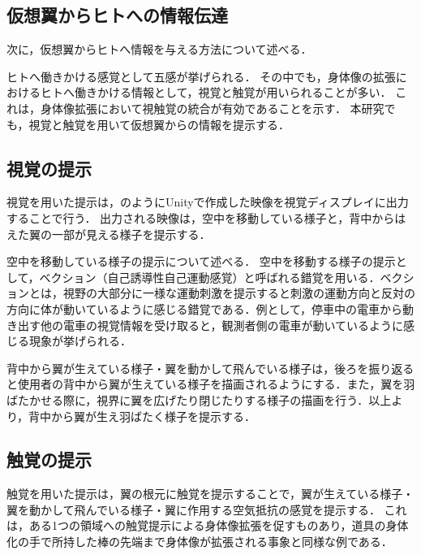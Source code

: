 \begin{small}
  \subsection{仮想翼からヒトへの情報伝達}
    次に，仮想翼からヒトへ情報を与える方法について述べる．

    ヒトへ働きかける感覚として五感が挙げられる．
    その中でも，身体像の拡張におけるヒトへ働きかける情報として，視覚と触覚が用いられることが多い．
    これは，身体像拡張において視触覚の統合が有効であることを示す．
    本研究でも，視覚と触覚を用いて仮想翼からの情報を提示する．
   

    \subsection{視覚の提示} %
      
      視覚を用いた提示は，のようにUnityで作成した映像を視覚ディスプレイに出力することで行う．
      出力される映像は，空中を移動している様子と，背中からはえた翼の一部が見える様子を提示する．

      空中を移動している様子の提示について述べる．
      空中を移動する様子の提示として，ベクション（自己誘導性自己運動感覚）と呼ばれる錯覚を用いる．ベクションとは，視野の大部分に一様な運動刺激を提示すると刺激の運動方向と反対の方向に体が動いているように感じる錯覚である\cite{妹尾武治2014ベクションとその周辺の近年の動向}．例として，停車中の電車から動き出す他の電車の視覚情報を受け取ると，観測者側の電車が動いているように感じる現象が挙げられる．

      背中から翼が生えている様子・翼を動かして飛んでいる様子は，後ろを振り返ると使用者の背中から翼が生えている様子を描画されるようにする．また，翼を羽ばたかせる際に，視界に翼を広げたり閉じたりする様子の描画を行う．以上より，背中から翼が生え羽ばたく様子を提示する．

    \subsection{触覚の提示} %
      触覚を用いた提示は，翼の根元に触覚を提示することで，翼が生えている様子・翼を動かして飛んでいる様子・翼に作用する空気抵抗の感覚を提示する．
      これは，ある1つの領域への触覚提示による身体像拡張を促すものあり，道具の身体化の手で所持した棒の先端まで身体像が拡張される事象と同様な例である．
      

\end{small}
